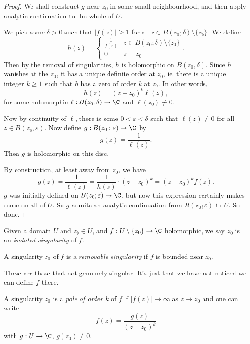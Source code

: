 \documentclass[a4paper]{article}
\begin{document}
\begin{proof}
  We shall construct $g$ near $z_0$ in some small neighbourhood, and then apply analytic continuation to the whole of $U$.

  We pick some $\delta > 0$ such that $|f(z)| \geq 1$ for all $z \in B(z_0; \delta) \setminus \{z_0\}$. We define
  \[
    h(z) =
    \begin{cases}
      \frac{1}{f(z)} & z \in B(z_0; \delta) \setminus \{z_0\}\\
      0 & z = z_0
    \end{cases}.
  \]
  Then by the removal of singularities, $h$ is holomorphic on $B(z_0, \delta)$. Since $h$ vanishes at the $z_0$, it has a unique definite order at $z_0$, ie. there is a unique integer $k \geq 1$ such that $h$ has a zero of order $k$ at $z_0$. In other words,
  \[
    h(z) = (z - z_0)^k \ell(z),
  \]
  for some holomorphic $\ell: B(z_0; \delta) \to \C$ and $\ell(z_0) \not= 0$.

  Now by continuity of $\ell$, there is some $0 < \varepsilon < \delta$ such that $\ell (z) \not= 0$ for all $z \in B(z_0, \varepsilon)$. Now define $g: B(z_0: \varepsilon) \to \C$ by
  \[
    g(z) = \frac{1}{\ell(z)}.
  \]
  Then $g$ is holomorphic on this disc.

  By construction, at least away from $z_0$, we have
  \[
    g(z) = \frac{1}{\ell(z)} = \frac{1}{h(z)} \cdot (z - z_0)^k = (z - z_0)^k f(z).
  \]
  $g$ was initially defined on $B(z_0; \varepsilon) \to \C$, but now this expression certainly makes sense on all of $U$. So $g$ admits an analytic continuation from $B(z_0; \varepsilon)$ to $U$. So done.
\end{proof}

\begin{defi}
  Given a domain $U$ and $z_0 \in U$, and $f: U \setminus \{z_0\} \to \C$ holomorphic, we say $z_0$ is an \emph{isolated singularity} of $f$.
\end{defi}

\begin{defi}
  A singularity $z_0$ of $f$ is a \emph{removable singularity} if $f$ is bounded near $z_0$.
\end{defi}
These are those that not genuinely singular. It's just that we have not noticed we can define $f$ there.

\begin{defi}[Pole]
  A singularity $z_0$ is a \emph{pole of order $k$} of $f$ if $|f(z)| \to \infty$ as $z \to z_0$ and one can write
  \[
    f(z) = \frac{g(z)}{(z - z_0)^k}
  \]
  with $g: U \to \C$, $g(z_0) \not= 0$.
\end{defi}
\end{document}
